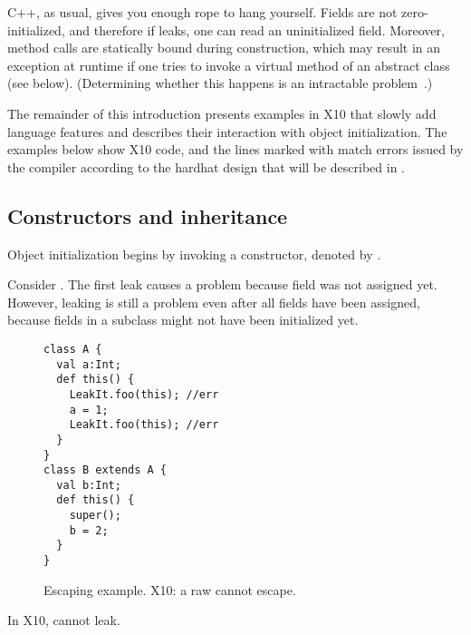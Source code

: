 \mbox{C++}, as usual, gives you enough rope to hang yourself.
Fields are not zero-initialized, and therefore if \this leaks,
    one can read an uninitialized field.
Moreover, method calls are statically bound during construction,
    which may result in an exception at runtime
    if one tries to invoke a virtual method of an abstract class (see  below).
(Determining whether this happens is an intractable problem~\cite{Gil:1998:CTA:646155.679689}.)


The remainder of this introduction presents examples in X10
    that slowly add language features and describes their interaction with
    object initialization.
The examples below show X10 code, and the lines marked with 
    match errors issued by the compiler according to the hardhat design that
    will be described in .

\subsection{Constructors and inheritance}
Object initialization begins by invoking a constructor, denoted by .

Consider .
The first leak causes a problem because field  was not assigned yet.
However, leaking is still a problem even after all fields have been assigned,
    because fields in a subclass might not have been initialized yet.

\begin{figure}
\begin{lstlisting}
class A {
  val a:Int;
  def this() {
    LeakIt.foo(this); //err
    a = 1;
    LeakIt.foo(this); //err
  }
}
class B extends A {
  val b:Int;
  def this() {
    super();
    b = 2;
  }
}
\end{lstlisting}
\caption{Escaping \this example.
    X10: a raw \this cannot escape.}
\label{Figure:Escaping-this}
\end{figure}

In X10, \this cannot leak.


